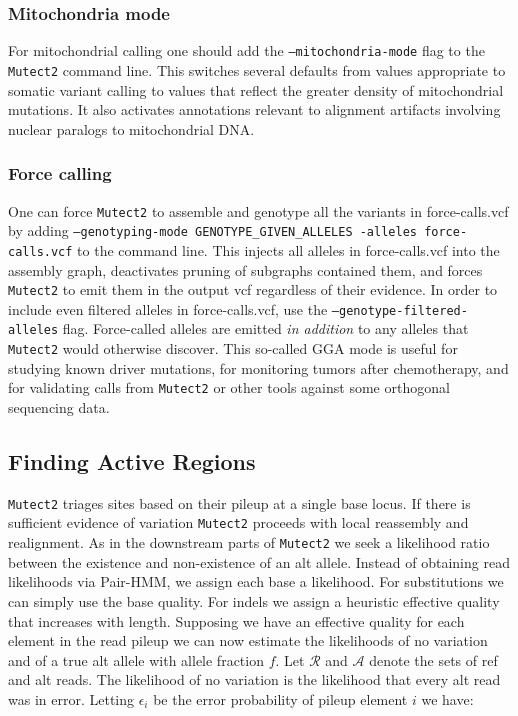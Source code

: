 \documentclass[nofootinbib,amssymb,amsmath]{revtex4}
\newcommand{\code}[1]{\texttt{#1}}
\begin{document}
\subsubsection{Mitochondria mode}
For mitochondrial calling one should add the \code{--mitochondria-mode} flag to the \code{Mutect2} command line.  This switches several defaults from values appropriate to somatic variant calling to values that reflect the greater density of mitochondrial mutations.  It also activates annotations relevant to alignment artifacts involving nuclear paralogs to mitochondrial DNA.

\subsubsection{Force calling}
One can force \code{Mutect2} to assemble and genotype all the variants in force-calls.vcf by adding \code{--genotyping-mode GENOTYPE\_GIVEN\_ALLELES -alleles force-calls.vcf} to the command line.  This injects all alleles in force-calls.vcf into the assembly graph, deactivates pruning of subgraphs contained them, and forces \code{Mutect2} to emit them in the output vcf regardless of their evidence.  In order to include even filtered alleles in force-calls.vcf, use the \code{--genotype-filtered-alleles} flag.  Force-called alleles are emitted \textit{in addition} to any alleles that \code{Mutect2} would otherwise discover.  This so-called GGA mode is useful for studying known driver mutations, for monitoring tumors after chemotherapy, and for validating calls from \code{Mutect2} or other tools against some orthogonal sequencing data.

\subsection{Finding Active Regions}
\code{Mutect2} triages sites based on their pileup at a single base locus.  If there is sufficient evidence of variation \code{Mutect2} proceeds with local reassembly and realignment.  As in the downstream parts of \code{Mutect2} we seek a likelihood ratio between the existence and non-existence of an alt allele.  Instead of obtaining read likelihoods via Pair-HMM, we assign each base a likelihood.  For substitutions we can simply use the base quality.  For indels we assign a heuristic effective quality that increases with length.  Supposing we have an effective quality for each element in the read pileup we can now estimate the likelihoods of no variation and of a true alt allele with allele fraction $f$.  Let $\mathcal{R}$ and $\mathcal{A}$ denote the sets of ref and alt reads.  The likelihood of no variation is the likelihood that every alt read was in error.  Letting $\epsilon_i$ be the error probability of pileup element $i$ we have:
\end{document}
